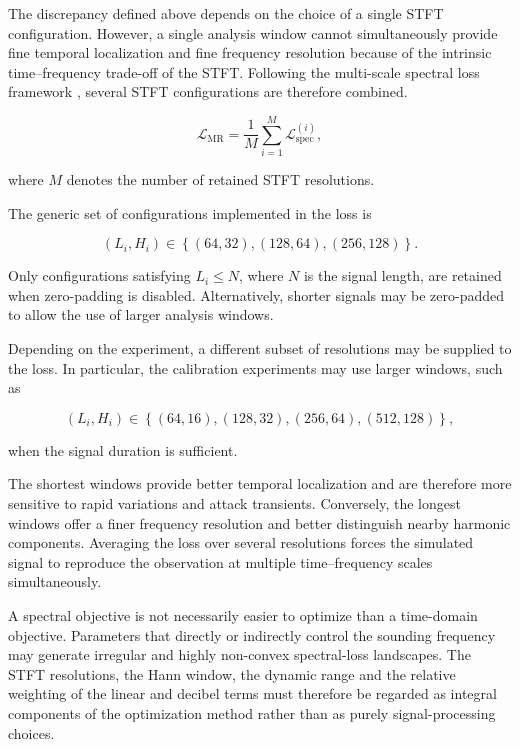 \documentclass[11pt,a4paper]{report}
\theoremstyle{plain}
\theoremstyle{definition}
\begin{document}
The discrepancy defined above depends on the choice of a single STFT
configuration. However, a single analysis window cannot simultaneously provide
fine temporal localization and fine frequency resolution because of the
intrinsic time--frequency trade-off of the STFT. Following the multi-scale
spectral loss framework \cite{schwaer2023multi}, several STFT configurations
are therefore combined.

\begin{equation}
\boxed{
\mathcal{L}_{\mathrm{MR}}
=
\frac{1}{M}
\sum_{i=1}^{M}
\mathcal{L}_{\mathrm{spec}}^{(i)},
}
\label{eq:mrstft_loss}
\end{equation}

where \(M\) denotes the number of retained STFT resolutions.

The generic set of configurations implemented in the loss is

\begin{equation}
(L_i,H_i)
\in
\left\{
(64,32),
(128,64),
(256,128)
\right\}.
\label{eq:default_stft_configurations}
\end{equation}

Only configurations satisfying \(L_i\leq N\), where \(N\) is the signal length,
are retained when zero-padding is disabled. Alternatively, shorter signals may
be zero-padded to allow the use of larger analysis windows.

Depending on the experiment, a different subset of resolutions may be supplied
to the loss. In particular, the calibration experiments may use larger windows,
such as

\begin{equation}
(L_i,H_i)
\in
\left\{
(64,16),
(128,32),
(256,64),
(512,128)
\right\},
\label{eq:experimental_stft_configurations}
\end{equation}

when the signal duration is sufficient.

The shortest windows provide better temporal localization and are therefore
more sensitive to rapid variations and attack transients. Conversely, the
longest windows offer a finer frequency resolution and better distinguish nearby
harmonic components. Averaging the loss over several resolutions forces the
simulated signal to reproduce the observation at multiple time--frequency
scales simultaneously.

A spectral objective is not necessarily easier to optimize than a time-domain
objective. Parameters that directly or indirectly control the sounding
frequency may generate irregular and highly non-convex spectral-loss
landscapes. The STFT resolutions, the Hann window, the dynamic range and the
relative weighting of the linear and decibel terms must therefore be regarded
as integral components of the optimization method rather than as purely
signal-processing choices.
\end{document}
